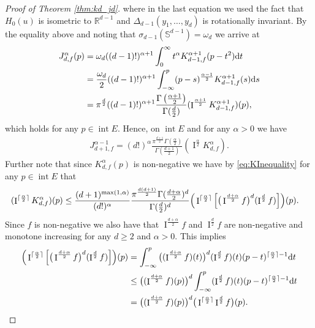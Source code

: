 \documentclass[11pt,a4paper]{article}
\theoremstyle{plain}
\theoremstyle{definition}
\theoremstyle{remark}
\def\RR{\mathbb{R}}
\def\SS{\mathbb{S}}
\newcommand{\dd}{{\rm d}}
\newcommand{\frI}{\mathop{\mathrm{I}}\nolimits}
\newcommand{\inter}{\operatorname{int}}
\newcommand{\dint}{\textup{d}}
\begin{document}
\begin{proof}[Proof of Theorem \ref{thm:kd_jd}]
    where in the last equation we used the fact that $H_0(u)$ is isometric to $\RR^{d-1}$ and $\Delta_{d-1}(y_1,\dots,y_d)$ is rotationally invariant. By the equality above and noting that $\sigma_{d-1}(\SS^{d-1})=\omega_d$ we arrive at
    \begin{align*}
        J_{d,f}^\alpha(p) 
        &=\omega_d ((d-1)!)^{\alpha+1}\int_{0}^{\infty} t^\alpha K_{d-1,f}^{\alpha+1}(p-t^2) \dd t\\
        &={\omega_d\over 2} ((d-1)!)^{\alpha+1}\int_{-\infty}^{p} (p-s)^{\alpha-1\over 2} K_{d-1,f}^{\alpha+1}(s) \dd s\\
        &=\pi^{\frac{d}{2}}((d-1)!)^{\alpha+1}\frac{\Gamma\left(\frac{\alpha+1}{2}\right)}{\Gamma(\frac{d}{2})}(\frI^{\frac{\alpha+1}{2}} K_{d-1,f}^{\alpha+1})(p),
    \end{align*}
    which holds for any $p\in \inter E$. Hence, on $\inter E$ and for any $\alpha>0$ we have
    \begin{align*}
        J_{d+1,f}^{\alpha-1}=(d!)^\alpha\frac{\pi^{\frac{d+1}{2}}\Gamma\left(\frac{\alpha}{2}\right)}{\Gamma(\frac{d+1}{2})}(\frI^{\frac{\alpha}{2}} K_{d,f}^{\alpha}).
    \end{align*}
    Further note that since $K_{d,f}^{\alpha}(p)$ is non-negative we have by \eqref{eq:KInequality} for any $p\in\inter E$ that
    \begin{align*}
      (\frI^{\lceil{\alpha\over 2}\rceil}K_{d,f}^{\alpha})(p)&\leq  {(d+1)^{\max(1,\alpha)}\over (d!)^{\alpha}}{\pi^{d(d+1)\over 2}\Gamma({d+\alpha\over 2})^d\over \Gamma({d\over 2})^d}\Big(\frI^{\lceil{\alpha\over 2}\rceil}\Big[\big(\frI^{{d+\alpha\over 2}}f\big)^d(\frI^{{d\over 2}}f)\Big]\Big)(p).
    \end{align*}
    Since $f$ is non-negative we also have that $\frI^{\frac{d+\alpha}{2}}f$ and $\frI^{\frac{d}{2}}f$ are non-negative and monotone increasing for any $d\ge 2$ and $\alpha>0$. This implies
    \begin{align*}
        \Big(\frI^{\lceil{\alpha\over 2}\rceil}\Big[\big(\frI^{{d+\alpha\over 2}}f\big)^d(\frI^{{d\over 2}}f)\Big]\Big)(p)&=\int_{-\infty}^p\big((\frI^{{d+\alpha\over 2}}f)(t)\big)^d(\frI^{{d\over 2}}f)(t)(p-t)^{\lceil{\alpha\over 2}\rceil-1}\dint t\\
        &\le\big((\frI^{{d+\alpha\over 2}}f)(p)\big)^d \int_{-\infty}^p(\frI^{{d\over 2}}f)(t)(p-t)^{\lceil{\alpha\over 2}\rceil-1}\dint t\\
        &=\big((\frI^{{d+\alpha\over 2}}f)(p)\big)^d \big(\frI^{\lceil{\alpha\over 2}\rceil}\frI^{{d\over 2}}f\big)(p).

\end{align*}
\end{proof}
\end{document}
